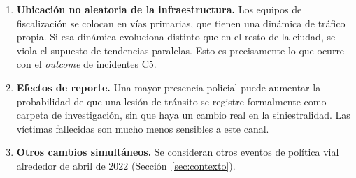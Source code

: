 \begin{enumerate}
  \item \textbf{Ubicación no aleatoria de la infraestructura.} Los equipos de
        fiscalización se colocan en vías primarias, que tienen una dinámica de
        tráfico propia. Si esa dinámica evoluciona distinto que en el resto de
        la ciudad, se viola el supuesto de tendencias paralelas. Esto es
        precisamente lo que ocurre con el \emph{outcome} de incidentes C5.
  \item \textbf{Efectos de reporte.} Una mayor presencia policial puede
        aumentar la probabilidad de que una lesión de tránsito se registre
        formalmente como carpeta de investigación, sin que haya un cambio real
        en la siniestralidad. Las víctimas fallecidas son mucho menos sensibles
        a este canal.
  \item \textbf{Otros cambios simultáneos.} Se consideran otros eventos de
        política vial alrededor de abril de 2022 (Sección~\ref{sec:contexto}).
\end{enumerate}
